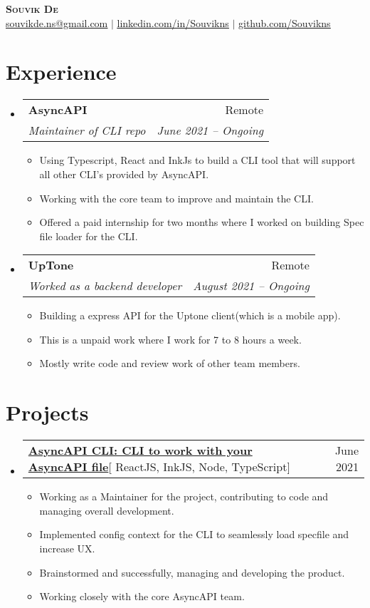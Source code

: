 \documentclass[letterpaper,11pt]{article}
\makeatletter
\newcommand{\resumeItem}[1]{
  \item\small{
    {#1 \vspace{-2pt}}
  }
}
\newcommand{\resumeSubheading}[4]{
  \vspace{-2pt}\item
    \begin{tabular*}{0.97\textwidth}[t]{l@{\extracolsep{\fill}}r}
      \textbf{#1} & #2 \\
      \textit{\small#3} & \textit{\small #4} \\
    \end{tabular*}\vspace{-7pt}
}
\newcommand{\resumeSubSubheading}[2]{
    \item
    \begin{tabular*}{0.97\textwidth}{l@{\extracolsep{\fill}}r}
      \textit{\small#1} & \textit{\small #2} \\
    \end{tabular*}\vspace{-7pt}
}
\newcommand{\resumeProjectHeading}[2]{
    \item
    \begin{tabular*}{0.97\textwidth}{l@{\extracolsep{\fill}}r}
      \small#1 & #2 \\
    \end{tabular*}\vspace{-7pt}
}
\newcommand{\resumeSubHeadingListStart}{\begin{itemize}[leftmargin=0.15in, label={}]}
\newcommand{\resumeSubHeadingListEnd}{\end{itemize}}
\newcommand{\resumeItemListStart}{\begin{itemize}}
\newcommand{\resumeItemListEnd}{\end{itemize}\vspace{-5pt}}
\makeatother
\begin{document}

\begin{center}
    \textbf{\Huge \scshape Souvik De} \\ \vspace{1pt}
    \href{mailto:souvikde.ns@gmail.com}{\underline{souvikde.ns@gmail.com}} $|$ 
    \href{https://www.linkedin.com/in/souvik-de-a2b941169/}{\underline{linkedin.com/in/Souvikns}} $|$
    \href{https://github.com/Souvikns}{\underline{github.com/Souvikns}}
\end{center}


\section{Experience}
  \resumeSubHeadingListStart

    \resumeSubheading
      {AsyncAPI}{Remote}
      {Maintainer of CLI repo}{June 2021 -- Ongoing}
      \resumeItemListStart
         \resumeItem{Using Typescript, React and InkJs to build a CLI tool that will support all other CLI's provided by AsyncAPI. }
         \resumeItem{Working with the core team to improve and maintain the CLI.}
         \resumeItem{Offered a paid internship for two months where I worked on building Spec file loader for the CLI.}
     \resumeItemListEnd
     
     \resumeSubheading
     {UpTone}{Remote}
      {Worked as a backend developer}{August 2021 -- Ongoing}
      \resumeItemListStart
         \resumeItem{Building a express API for the Uptone client(which is a mobile app). }
         \resumeItem{This is a unpaid work where I work for 7 to 8 hours a week.}
         \resumeItem{Mostly write code and review work of other team members.}
     \resumeItemListEnd

    
  \resumeSubHeadingListEnd
  


\section{Projects}
    \resumeSubHeadingListStart
      \resumeProjectHeading
          {\textbf{\href{https://github.com/asyncapi/cli} {AsyncAPI CLI: CLI to work with your AsyncAPI file}}{[ ReactJS, InkJS, Node, TypeScript]}}{June 2021}
          \resumeItemListStart
            \resumeItem{ Working as a Maintainer for the project, contributing to code and managing overall development.}
            \resumeItem{ Implemented config context for the CLI to seamlessly load specfile and increase UX. }
            \resumeItem{ Brainstormed and successfully, managing and developing the product.}
            \resumeItem{ Working closely with the core AsyncAPI team. }
          \resumeItemListEnd
    \resumeSubHeadingListEnd
    
\end{document}
